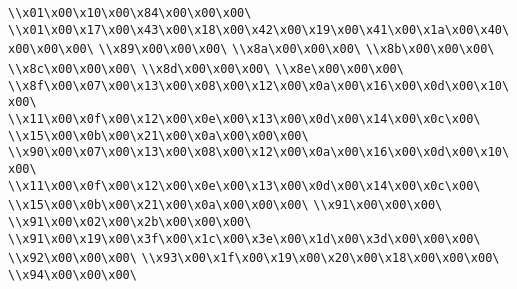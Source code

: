 \verb|\\x01\x00\x10\x00\x84\x00\x00\x00\|\newline
\verb|\\x01\x00\x17\x00\x43\x00\x18\x00\x42\x00\x19\x00\x41\x00\x1a\x00\x40\x00\x00\x00\|\newline
\verb|\\x89\x00\x00\x00\|\newline
\verb|\\x8a\x00\x00\x00\|\newline
\verb|\\x8b\x00\x00\x00\|\newline
\verb|\\x8c\x00\x00\x00\|\newline
\verb|\\x8d\x00\x00\x00\|\newline
\verb|\\x8e\x00\x00\x00\|\newline
\verb|\\x8f\x00\x07\x00\x13\x00\x08\x00\x12\x00\x0a\x00\x16\x00\x0d\x00\x10\x00\|\newline
\verb|\\x11\x00\x0f\x00\x12\x00\x0e\x00\x13\x00\x0d\x00\x14\x00\x0c\x00\|\newline
\verb|\\x15\x00\x0b\x00\x21\x00\x0a\x00\x00\x00\|\newline
\verb|\\x90\x00\x07\x00\x13\x00\x08\x00\x12\x00\x0a\x00\x16\x00\x0d\x00\x10\x00\|\newline
\verb|\\x11\x00\x0f\x00\x12\x00\x0e\x00\x13\x00\x0d\x00\x14\x00\x0c\x00\|\newline
\verb|\\x15\x00\x0b\x00\x21\x00\x0a\x00\x00\x00\|\newline
\verb|\\x91\x00\x00\x00\|\newline
\verb|\\x91\x00\x02\x00\x2b\x00\x00\x00\|\newline
\verb|\\x91\x00\x19\x00\x3f\x00\x1c\x00\x3e\x00\x1d\x00\x3d\x00\x00\x00\|\newline
\verb|\\x92\x00\x00\x00\|\newline
\verb|\\x93\x00\x1f\x00\x19\x00\x20\x00\x18\x00\x00\x00\|\newline
\verb|\\x94\x00\x00\x00\|\newline
